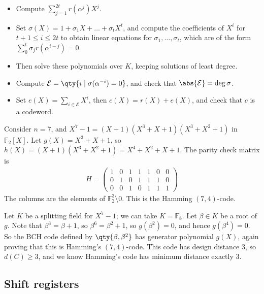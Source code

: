 \begin{itemize}
    \item Compute $\sum_{j=1}^{2t} r(\alpha^j) X^j$.
    \item Set $\sigma(X) = 1 + \sigma_1 X + \dots + \sigma_t X^t$, and compute the coefficients of $X^i$ for $t + 1 \leq i \leq 2t$ to obtain linear equations for $\sigma_1, \dots, \sigma_t$, which are of the form $\sum_0^t \sigma_j r(\alpha^{i-j}) = 0$.
    \item Then solve these polynomials over $K$, keeping solutions of least degree.
    \item Compute $\mathcal E = \qty{i \mid \sigma(\alpha^{-i}) = 0}$, and check that $\abs{\mathcal E} = \deg \sigma$.
    \item Set $e(X) = \sum_{i \in \mathcal E} X^i$, then $c(X) = r(X) + e(X)$, and check that $c$ is a codeword.
\end{itemize}

\begin{example}
    Consider $n = 7$, and $X^7 - 1 = (X + 1)(X^3 + X + 1)(X^3 + X^2 + 1)$ in $\mathbb F_2[X]$.
    Let $g(X) = X^3 + X + 1$, so $h(X) = (X + 1)(X^3 + X^2 + 1) = X^4 + X^2 + X + 1$.
    The parity check matrix is
    \begin{align*}
        H = \begin{pmatrix}
            1 & 0 & 1 & 1 & 1 & 0 & 0 \\
            0 & 1 & 0 & 1 & 1 & 1 & 0 \\
            0 & 0 & 1 & 0 & 1 & 1 & 1
        \end{pmatrix}
    \end{align*}
    The columns are the elements of $\mathbb F_2^3 \setminus \qty{0}$.
    This is the Hamming $(7,4)$-code.

    Let $K$ be a splitting field for $X^7 - 1$; we can take $K = \mathbb F_8$.
    Let $\beta \in K$ be a root of $g$.
    Note that $\beta^3 = \beta + 1$, so $\beta^6 = \beta^2 + 1$, so $g(\beta^2) = 0$, and hence $g(\beta^4) = 0$.
    So the BCH code defined by $\qty{\beta, \beta^2}$ has generator polynomial $g(X)$, again proving that this is Hamming's $(7,4)$-code.
    This code has design distance $3$, so $d(C) \geq 3$, and we know Hamming's code has minimum distance exactly 3.
\end{example}

\subsection{Shift registers}

